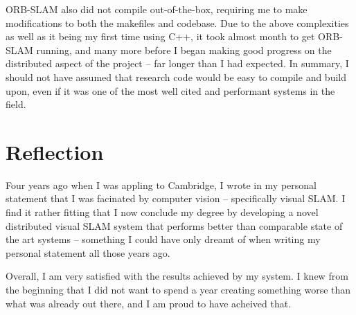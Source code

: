 ORB-SLAM also did not compile out-of-the-box, requiring me to make modifications to both the makefiles and codebase. Due to the above complexities as well as it being my first time using C++, it took almost month to get ORB-SLAM running, and many more before I began making good progress on the distributed aspect of the project – far longer than I had expected. In summary, I should not have assumed that research code would be easy to compile and build upon, even if it was one of the most well cited and performant systems in the field. %

\section{Reflection}
\label{sec:reflection}

Four years ago when I was appling to Cambridge, I wrote in my personal statement that I was facinated by computer vision – specifically visual SLAM. I find it rather fitting that I now conclude my degree by developing a novel distributed visual SLAM system that performs better than comparable state of the art systems – something I could have only dreamt of when writing my personal statement all those years ago.

Overall, I am very satisfied with the results achieved by my system. I knew from the beginning that I did not want to spend a year creating something worse than what was already out there, and I am proud to have acheived that.